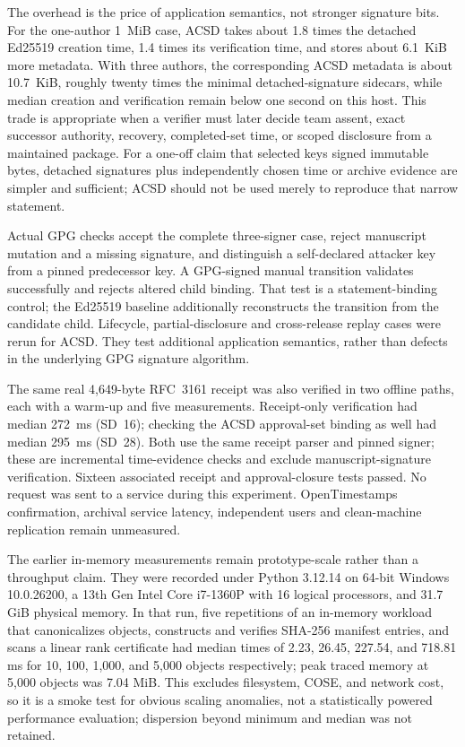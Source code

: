 \documentclass[acmsmall,screen,review,nonacm]{acmart}
\begin{document}
The overhead is the price of application semantics, not stronger signature
bits. For the one-author 1~MiB case, ACSD takes about 1.8 times the detached
Ed25519 creation time, 1.4 times its verification time, and stores about 6.1~KiB
more metadata. With three authors, the corresponding ACSD metadata is about
10.7~KiB, roughly twenty times the minimal detached-signature sidecars, while
median creation and verification remain below one second on this host. This
trade is appropriate when a verifier must later decide team assent, exact
successor authority, recovery, completed-set time, or scoped disclosure from a
maintained package. For a one-off claim that selected keys signed immutable
bytes, detached signatures plus independently chosen time or archive evidence
are simpler and sufficient; ACSD should not be used merely to reproduce that
narrow statement.

Actual GPG checks accept the complete three-signer case, reject manuscript
mutation and a missing signature, and distinguish a self-declared attacker
key from a pinned predecessor key. A GPG-signed manual transition validates
successfully and rejects altered child binding. That test is a statement-binding
control; the Ed25519 baseline additionally reconstructs the transition from the
candidate child. Lifecycle, partial-disclosure and cross-release replay cases
were rerun for ACSD. They test additional application semantics, rather than
defects in the underlying GPG signature algorithm.

The same real 4,649-byte RFC~3161 receipt was also verified in two offline
paths, each with a warm-up and five measurements. Receipt-only verification
had median 272~ms (SD~16); checking the ACSD approval-set binding as well had
median 295~ms (SD~28). Both use the same receipt parser and pinned signer;
these are incremental time-evidence checks and exclude manuscript-signature
verification. Sixteen associated receipt and approval-closure tests passed.
No request was sent to a service during this experiment. OpenTimestamps
confirmation, archival service latency, independent users and clean-machine
replication remain unmeasured.


The earlier in-memory measurements remain prototype-scale rather than a throughput claim. They
were recorded under Python 3.12.14 on 64-bit Windows 10.0.26200, a 13th Gen
Intel Core i7-1360P with 16 logical processors, and 31.7 GiB physical memory.
In that run, five repetitions of an in-memory workload that canonicalizes
objects, constructs and verifies SHA-256 manifest entries, and scans a linear
rank certificate had median times of 2.23, 26.45, 227.54, and 718.81 ms for
10, 100, 1,000, and 5,000 objects respectively; peak traced memory at 5,000
objects was 7.04 MiB. This excludes filesystem, COSE, and network cost, so it
is a smoke test for obvious scaling anomalies, not a statistically powered
performance evaluation; dispersion beyond minimum and median was not retained.
\end{document}
